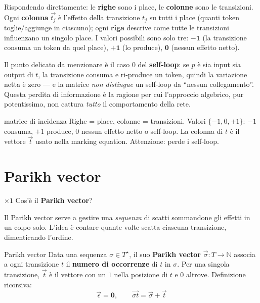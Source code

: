 Rispondendo direttamente: le \textbf{righe} sono i place, le \textbf{colonne} sono le transizioni. Ogni \textbf{colonna} $\vec{t_j}$ è l'effetto della transizione $t_j$ su tutti i place (quanti token toglie/aggiunge in ciascuno); ogni \textbf{riga} descrive come tutte le transizioni influenzano un singolo place. I valori possibili sono solo tre: $\mathbf{-1}$ (la transizione consuma un token da quel place), $\mathbf{+1}$ (lo produce), $\mathbf{0}$ (nessun effetto netto).

Il punto delicato da menzionare è il caso $0$ del \textbf{self-loop}: se $p$ è sia input sia output di $t$, la transizione consuma e ri-produce un token, quindi la variazione netta è zero — e la matrice \emph{non distingue} un self-loop da ``nessun collegamento''. Questa perdita di informazione è la ragione per cui l'approccio algebrico, pur potentissimo, non cattura \emph{tutto} il comportamento della rete.

\begin{puntochiave}{matrice di incidenza}
Righe = place, colonne = transizioni. Valori $\{-1,0,+1\}$: $-1$ consuma, $+1$ produce, $0$ nessun effetto netto o self-loop. La colonna di $t$ è il vettore $\vec t$ usato nella marking equation. Attenzione: perde i self-loop.
\end{puntochiave}

\section{Parikh vector}

\begin{domanda}{$\times 1$}
Cos'è il \textbf{Parikh vector}?
\end{domanda}

Il Parikh vector serve a gestire una \emph{sequenza} di scatti sommandone gli effetti in un colpo solo. L'idea è contare quante volte scatta ciascuna transizione, dimenticando l'ordine.

\begin{definizione}{Parikh vector}
Data una sequenza $\sigma \in T^\star$, il suo \textbf{Parikh vector} $\vec{\sigma} : T \to \mathbb{N}$ associa a ogni transizione $t$ il \textbf{numero di occorrenze} di $t$ in $\sigma$. Per una singola transizione, $\vec{t}$ è il vettore con un $1$ nella posizione di $t$ e $0$ altrove. Definizione ricorsiva:
$$\vec{\epsilon} = \mathbf{0}, \qquad \overrightarrow{\sigma t} = \vec{\sigma} + \vec{t}$$
\end{definizione}

